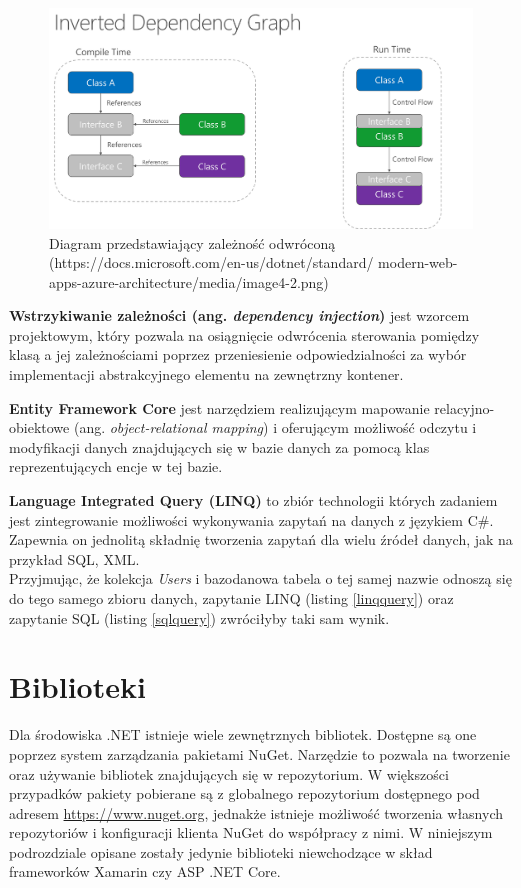 \begin{figure}[!ht]
	\begin{center}
		\includegraphics[width=6in]{img/diagram/inverted_dependency.png}
		\caption{Diagram przedstawiający zależność odwróconą (https://docs.microsoft.com/en-us/dotnet/standard/ modern-web-apps-azure-architecture/media/image4-2.png)}
		\label{inverted_dependency}
	\end{center}
\end{figure}
\textbf{Wstrzykiwanie zależności (ang. \textit{dependency injection})} jest wzorcem projektowym, który pozwala na osiągnięcie odwrócenia sterowania pomiędzy klasą a jej zależnościami poprzez przeniesienie odpowiedzialności za wybór implementacji abstrakcyjnego elementu na zewnętrzny kontener.\cite{dependencyinjection}

\textbf{Entity Framework Core} jest narzędziem realizującym mapowanie relacyjno-obiektowe (ang. \textit{object-relational mapping}) i oferującym możliwość odczytu i modyfikacji danych znajdujących się w bazie danych za pomocą klas reprezentujących encje w tej bazie.\cite{efcore}

\textbf{Language Integrated Query (LINQ)} to zbiór technologii których zadaniem jest zintegrowanie możliwości wykonywania zapytań na danych z językiem C\#. Zapewnia on jednolitą składnię tworzenia zapytań dla wielu źródeł danych, jak na przykład SQL, XML.\cite{linq}\\
Przyjmując, że kolekcja \textit{Users} i bazodanowa tabela o tej samej nazwie odnoszą się do tego samego zbioru danych, zapytanie LINQ (listing \ref{linqquery}) oraz zapytanie SQL (listing \ref{sqlquery}) zwróciłyby taki sam wynik.


\section{Biblioteki}
Dla środowiska .NET istnieje wiele zewnętrznych bibliotek. Dostępne są one poprzez system zarządzania pakietami NuGet. Narzędzie to pozwala na tworzenie oraz używanie bibliotek znajdujących się w repozytorium. W większości przypadków pakiety pobierane są z globalnego repozytorium dostępnego pod adresem \url{https://www.nuget.org}, jednakże istnieje możliwość tworzenia własnych repozytoriów i konfiguracji klienta NuGet do współpracy z nimi. W niniejszym podrozdziale opisane zostały jedynie biblioteki niewchodzące w skład frameworków Xamarin czy ASP .NET Core.

